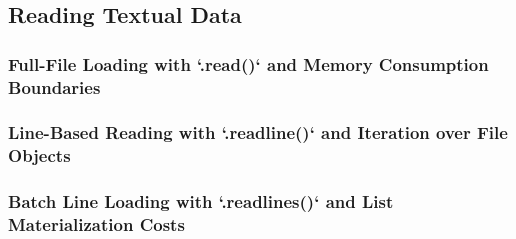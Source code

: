 \subsection{Reading Textual Data}
\subsubsection{Full-File Loading with `.read()` and Memory Consumption Boundaries}
\subsubsection{Line-Based Reading with `.readline()` and Iteration over File Objects}
\subsubsection{Batch Line Loading with `.readlines()` and List Materialization Costs}
